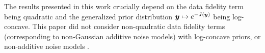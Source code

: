 The results presented in this work crucially depend on the data fidelity term being quadratic and the generalized prior distribution $\boldsymbol{y} \mapsto e^{-J(\boldsymbol{y})}$ being log-concave. This paper did not consider non-quadratic data fidelity terms (corresponding to non-Gaussian additive noise models) with log-concave priors, or non-additive noise models \cite{boncelet2009image,boyat2015review}.